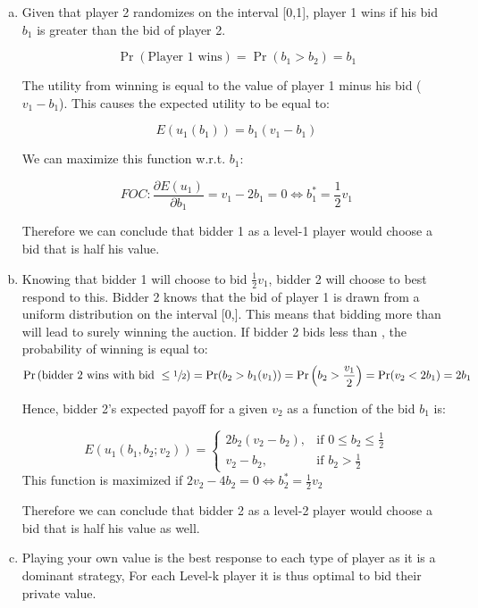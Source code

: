 \documentclass[a4paper]{article}
\begin{document}
\begin{enumerate}[(a)]
\item
Given that player 2 randomizes on the interval [0,1], player 1 wins if his bid $b_1$ is greater than the bid of player 2.

\[\Pr(\text{Player 1 wins})=\Pr(b_1>b_2)=b_1\]

The utility from winning is equal to the value of player 1 minus his bid (\(v_1-b_1\)). This causes the expected utility to be equal to:

\[E(u_1(b_1))=b_1\left(v_1-b_1\right)\]

We can maximize this function w.r.t. $b_1$:

\[FOC: \frac{\partial E(u_1)}{\partial b_1}=v_1-2b_1=0 \iff b_1^*=\frac{1}{2}v_1\]

Therefore we can conclude that bidder 1 as a level-1 player would choose a bid that is half his value.

\item

Knowing that bidder 1 will choose to bid $\frac{1}{2}v_1$, bidder 2 will choose to best respond to this. Bidder 2 knows that the bid of player 1 is drawn from a uniform distribution on the interval [0,]. This means that bidding more than  will lead to surely winning the auction. If bidder 2 bids less than , the probability of winning is equal to:
\[\Pr\left(\text{bidder 2 wins with bid }\le \sfrac{1}{2}\right)=\Pr(b_2>b_1(v_1))=\Pr\left(b_2>\frac{v_1}{2}\right)=\Pr(v_2<2b_1)=2b_1\]

Hence, bidder 2's expected payoff for a given $v_2$ as a function of the bid $b_1$ is:

\[
    E(u_1(b_1,b_2;v_2))= 
\begin{cases}
    2b_2(v_2-b_2),& \text{if } 0 \le b_2 \le \frac{1}{2}\\
    v_2-b_2,              & \text{if } b_2>\frac{1}{2}
\end{cases}
\]
This function is maximized if $2v_2-4b_2=0 \iff b_2^*=\frac{1}{2}v_2$

Therefore we can conclude that bidder 2 as a level-2 player would choose a bid that is half his value as well.  


\item

Playing your own value is the best response to each type of player as it is a
dominant strategy, For each Level-k player it is thus optimal to bid
their private value.

\end{enumerate}
\end{document}
